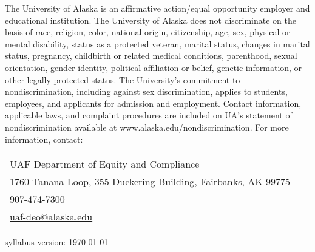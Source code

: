 \documentclass[12pt]{article}
\def\mailto#1{\href{mailto:#1}{#1}}
\begin{document}
The University of Alaska is an affirmative action/equal opportunity employer and educational institution. The University of Alaska does not discriminate on the basis of race, religion, color, national origin, citizenship, age, sex, physical or mental disability, status as a protected veteran, marital status, changes in marital status, pregnancy, childbirth or related medical conditions, parenthood, sexual orientation, gender identity, political affiliation or belief, genetic information, or other legally protected status. The University's commitment to nondiscrimination, including against sex discrimination, applies to students, employees, and applicants for admission and employment. Contact information, applicable laws, and complaint procedures are included on UA's statement of nondiscrimination available at www.alaska.edu/nondiscrimination. For more information, contact:

\begin{tabular}{l}
UAF Department of Equity and Compliance\\
1760 Tanana Loop, 355 Duckering Building, Fairbanks, AK  99775\\
907-474-7300\\
\mailto{uaf-deo@alaska.edu}
\end{tabular}

 \scriptsize syllabus version: \today \normalsize
\end{document}
